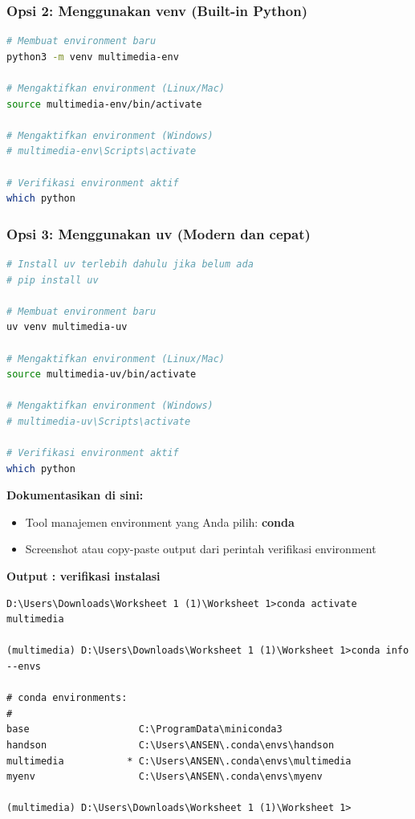 \documentclass[11pt,a4paper]{article}
\begin{document}
\subsubsection{Opsi 2: Menggunakan venv (Built-in Python)}
\begin{lstlisting}[language=bash, caption=Membuat environment dengan venv]
# Membuat environment baru
python3 -m venv multimedia-env

# Mengaktifkan environment (Linux/Mac)
source multimedia-env/bin/activate

# Mengaktifkan environment (Windows)
# multimedia-env\Scripts\activate

# Verifikasi environment aktif
which python
\end{lstlisting}

\subsubsection{Opsi 3: Menggunakan uv (Modern dan cepat)}
\begin{lstlisting}[language=bash, caption=Membuat environment dengan uv]
# Install uv terlebih dahulu jika belum ada
# pip install uv

# Membuat environment baru
uv venv multimedia-uv

# Mengaktifkan environment (Linux/Mac)
source multimedia-uv/bin/activate

# Mengaktifkan environment (Windows)
# multimedia-uv\Scripts\activate

# Verifikasi environment aktif
which python
\end{lstlisting}

\textbf{Dokumentasikan di sini:}
\begin{itemize}
    \item Tool manajemen environment yang Anda pilih: \textbf{conda}
    \item Screenshot atau copy-paste output dari perintah verifikasi environment
\end{itemize}

\textbf{Output : verifikasi instalasi}
\begin{lstlisting}[caption=Output verifikasi instalasi Environment Melalui Conda]
D:\Users\Downloads\Worksheet 1 (1)\Worksheet 1>conda activate multimedia

(multimedia) D:\Users\Downloads\Worksheet 1 (1)\Worksheet 1>conda info --envs

# conda environments:
#
base                   C:\ProgramData\miniconda3
handson                C:\Users\ANSEN\.conda\envs\handson
multimedia           * C:\Users\ANSEN\.conda\envs\multimedia
myenv                  C:\Users\ANSEN\.conda\envs\myenv

(multimedia) D:\Users\Downloads\Worksheet 1 (1)\Worksheet 1>
\end{lstlisting}
\end{document}

